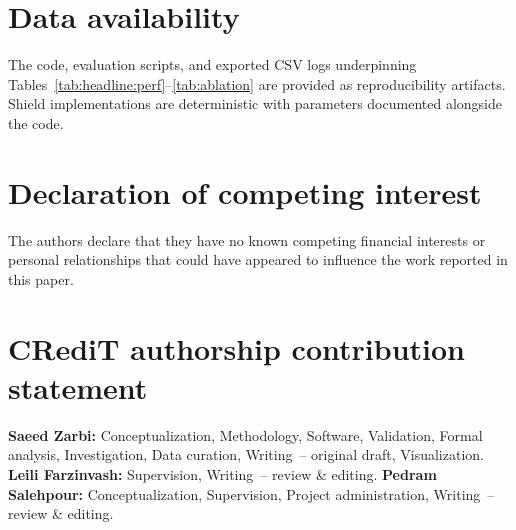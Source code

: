 \documentclass[preprint,12pt,times]{elsarticle}
\begin{document}
\section*{Data availability}
The code, evaluation scripts, and exported CSV logs underpinning Tables~\ref{tab:headline:perf}--\ref{tab:ablation} are provided as reproducibility artifacts. Shield implementations are deterministic with parameters documented alongside the code.

\section*{Declaration of competing interest}
The authors declare that they have no known competing financial interests or personal relationships that could have appeared to influence the work reported in this paper.

\section*{CRediT authorship contribution statement}
\textbf{Saeed Zarbi:} Conceptualization, Methodology, Software, Validation, Formal analysis, Investigation, Data curation, Writing~-- original draft, Visualization.
\textbf{Leili Farzinvash:} Supervision, Writing~-- review \& editing.
\textbf{Pedram Salehpour:} Conceptualization, Supervision, Project administration, Writing~-- review \& editing.

\clearpage



\end{document}
